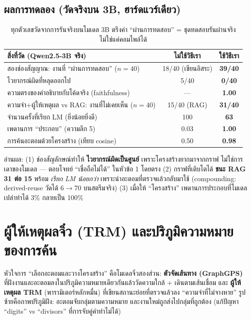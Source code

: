 \documentclass[fontsize=16pt,a4paper]{scrartcl}
\begin{document}
\subsection{ผลการทดลอง (วัดจริงบน 3B, ฮาร์ดแวร์เดียว)}
\begin{table}[H]\centering\small
\begin{tabular}{@{}>{\raggedright\arraybackslash}p{8.8cm}cc@{}}
\toprule
\textbf{สิ่งที่วัด (Qwen2.5-3B จริง)} & \textbf{ไม่ใช้วิธีเรา} & \textbf{ใช้วิธีเรา}\\
\midrule
สองช่องสัญญาณ: งานที่ ``ผ่านการทดสอบ'' ($n{=}40$) & 18/40 (เขียนอิสระ) & \textbf{39/40}\\
\quad ไวยากรณ์ผิดที่หลุดออกไป & 5/40 & \textbf{0/40}\\
\quad ความตรงของคำอธิบายกับโค้ดจริง (faithfulness) & --- & \textbf{1.00}\\
ความจำ+ผู้ให้เหตุผล vs RAG: งานที่ไม่เคยเห็น ($n{=}40$) & 15/40 (RAG) & \textbf{31/40}\\
\quad จำนวนครั้งที่เรียก LM (ยิ่งน้อยยิ่งดี) & 100 & \textbf{63}\\
เพดานการ ``ประกอบ'' (ความลึก 5) & 0.03 & \textbf{1.00}\\
การค้นอะตอมด้วยโครงสร้าง (เทียบ cosine) & 0.50 & \textbf{0.98}\\
\bottomrule
\end{tabular}
\caption{ทุกตัวเลขวัดจากการรันจริงบนโมเดล 3B ตรึงค่า ``ผ่านการทดสอบ'' = ชุดทดสอบรันผ่านจริง ไม่ใช่แค่คอมไพล์ได้}
\label{tab:res}
\end{table}

\noindent อ่านผล: (1) ช่องสัญลักษณ์ทำให้ \textbf{ไวยากรณ์ผิดเป็นศูนย์} เพราะโครงสร้างยากมาจากกราฟ ไม่ใช่การเดาของโมเดล --- ตอบโจทย์ ``เชื่อถือไม่ได้'' ในหัวข้อ 1 โดยตรง (2) กราฟที่เติบโตได้ \textbf{ชนะ RAG 31 ต่อ 15} พร้อม \emph{เรียก LM น้อยกว่า} เพราะนำอะตอมที่ตรวจแล้วกลับมาใช้ (compounding: derived-reuse วัดได้ 6$\to$70 บนสตรีมจริง) (3) เมื่อให้ ``โครงสร้าง'' เพดานการประกอบที่โมเดลเปล่าทำได้ 3\% กลายเป็น 100\%

\section{ผู้ให้เหตุผลจิ๋ว (TRM) และปริภูมิความหมายของการค้น}
หัวใจการ ``เลือกอะตอมและวางโครงสร้าง'' คือโมเดลจิ๋วสองส่วน: \textbf{ตัวจัดเส้นทาง (GraphGPS)} ที่ฝังงานและอะตอมลงในปริภูมิความหมายเดียวกันแล้ววัดความใกล้ + เดินตามเส้นเชื่อม และ \textbf{ผู้ให้เหตุผล TRM} (พารามิเตอร์หลักหมื่น) ที่เขียนสถานะย่อยที่ตรวจแล้วลง ``ความจำที่ไม่จางหาย'' รูปซ้ายคือภาพปริภูมิฝัง: อะตอมจับกลุ่มตามความหมาย และงานใหม่ถูกส่งไปกลุ่มที่ถูกต้อง (แก้ปัญหา ``digits'' vs ``divisors'' ที่การจับคู่คำทำไม่ได้)
\end{document}
